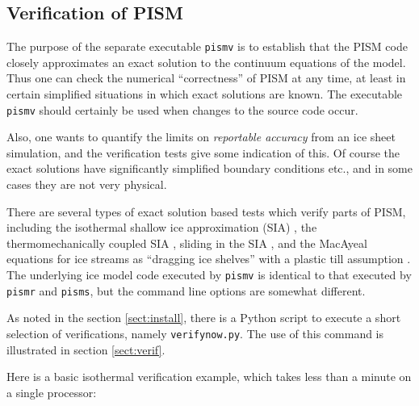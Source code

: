 \documentclass[12pt,final]{amsart}
\renewcommand{\t}[1]{\texttt{#1}}
\begin{document}
\subsection{Verification of PISM}  The purpose of the separate executable \t{pismv} is to establish that the PISM code closely approximates an exact solution to the continuum equations of the model.  Thus one can check the numerical ``correctness'' of PISM at any time, at least in certain simplified situations in which exact solutions are known.  The executable \t{pismv} should certainly be used when changes to the source code occur.

Also, one wants to quantify the limits on \emph{reportable accuracy} from an ice sheet simulation, and the verification tests give some indication of this.  Of course the exact solutions have significantly simplified boundary conditions etc., and in some cases they are not very physical.

There are several types of exact solution based tests which verify parts of PISM, including the isothermal shallow ice approximation (SIA) \cite{BLKCB}, the thermomechanically coupled SIA \cite{BBL,BB}, sliding in the SIA \cite{BLKCB}, and the MacAyeal equations for ice streams as ``dragging ice shelves'' \cite{MacAyeal} with a plastic till assumption \cite{SchoofStream}.  The underlying ice model code executed by \t{pismv} is identical to that executed by \verb|pismr| and \verb|pisms|, but the command line options are somewhat different.

As noted in the section \ref{sect:install}, there is a Python script to execute a short selection of verifications, namely \t{verifynow.py}.  The use of this command is illustrated in section \ref{sect:verif}.

Here is a basic isothermal verification example, which takes less than a minute on a single processor:
\end{document}
